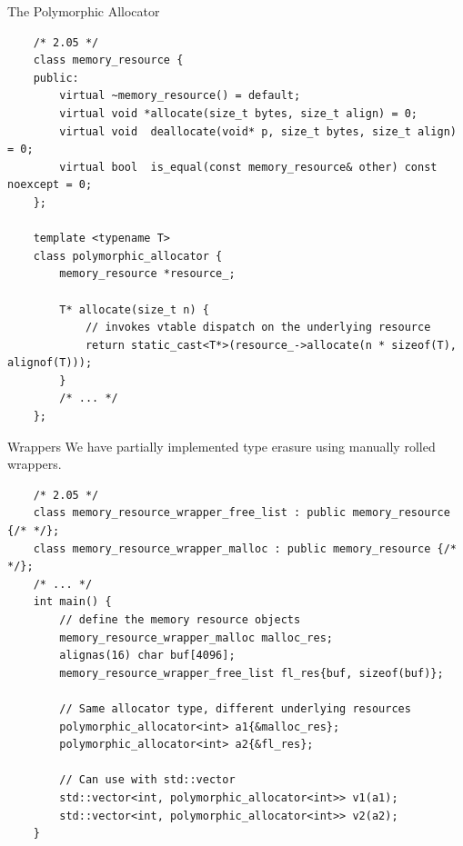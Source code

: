 \begin{frame}[fragile]{The Polymorphic Allocator}
  \begin{verbatim}
    /* 2.05 */
    class memory_resource {
    public:
        virtual ~memory_resource() = default;
        virtual void *allocate(size_t bytes, size_t align) = 0;
        virtual void  deallocate(void* p, size_t bytes, size_t align) = 0;
        virtual bool  is_equal(const memory_resource& other) const noexcept = 0;
    };

    template <typename T>
    class polymorphic_allocator {
        memory_resource *resource_;

        T* allocate(size_t n) {
            // invokes vtable dispatch on the underlying resource
            return static_cast<T*>(resource_->allocate(n * sizeof(T), alignof(T)));
        }
        /* ... */
    };
  \end{verbatim}
\end{frame}



\begin{frame}[fragile]{Wrappers}
  We have partially implemented type erasure using manually rolled wrappers.

  \begin{verbatim}
    /* 2.05 */
    class memory_resource_wrapper_free_list : public memory_resource {/* */};
    class memory_resource_wrapper_malloc : public memory_resource {/* */};
    /* ... */
    int main() {
        // define the memory resource objects
        memory_resource_wrapper_malloc malloc_res;
        alignas(16) char buf[4096];
        memory_resource_wrapper_free_list fl_res{buf, sizeof(buf)};

        // Same allocator type, different underlying resources
        polymorphic_allocator<int> a1{&malloc_res};
        polymorphic_allocator<int> a2{&fl_res};

        // Can use with std::vector
        std::vector<int, polymorphic_allocator<int>> v1(a1);
        std::vector<int, polymorphic_allocator<int>> v2(a2);
    }
  \end{verbatim}
\end{frame}
